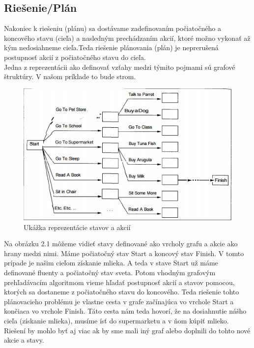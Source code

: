 \subsection{Riešenie/Plán}
Nakoniec k riešeniu (plánu) sa dostávame zadefinovaním počiatočného a koncového stavu (cieľa) a nasledným prechádzaním akcií, ktoré možno vykonať až kým nedosiahneme cieľa.Teda riešenie plánovania (plán) je neprerušená postupnosť akcií z počiatočného stavu do cieľa.\\
Jedna z reprezentácii ako definovať vzťahy medzi týmito pojmami sú grafové štruktúry. V našom príklade to bude strom.
\begin{figure}[ht] 
\begin{center}
\includegraphics[scale=1.0]{img/plan.png}
\caption{Ukážka reprezentácie stavov a akcií \cite{approach}}
\label{fig:ch21}
\end{center}
\end{figure}
Na obrázku 2.1 môžeme vidieť stavy definované ako vrcholy grafu a akcie ako hrany medzi nimi. Máme počiatočný stav Start a koncový stav Finish. V tomto prípade je našim cieľom získanie mlieka. A teda v stave Start už máme definované fluenty a počiatočný stav sveta. Potom vhodným grafovým prehľadávacím algoritmom vieme hľadať postupnosť akcií a stavov pomocou, ktorých sa dostaneme z počiatočného stavu do koncového. Teda riešenie tohto plánovacieho problému je vlastne cesta v grafe začínajúca vo vrchole Start a končiaca vo vrchole Finish. Táto cesta nám teda hovorí, že na dosiahnutie nášho cieľa (získanie mlieka), musíme ísť do supermarketu a v ňom kúpiť mlieko. Riešení by mohlo byť aj viac ak by sme mali iný graf alebo doplnili do tohto nové akcie a stavy.

